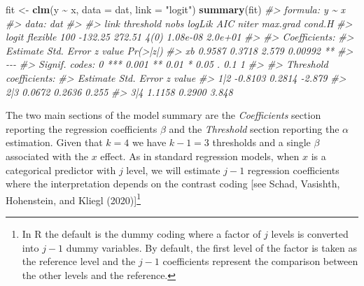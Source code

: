 \documentclass[
  man,floatsintext]{apa6}
\newenvironment{Shaded}{\begin{snugshade}}{\end{snugshade}}
\newcommand{\AttributeTok}[1]{\textcolor[rgb]{0.13,0.29,0.53}{#1}}
\newcommand{\CommentTok}[1]{\textcolor[rgb]{0.56,0.35,0.01}{\textit{#1}}}
\newcommand{\FunctionTok}[1]{\textcolor[rgb]{0.13,0.29,0.53}{\textbf{#1}}}
\newcommand{\NormalTok}[1]{#1}
\newcommand{\OtherTok}[1]{\textcolor[rgb]{0.56,0.35,0.01}{#1}}
\newcommand{\SpecialCharTok}[1]{\textcolor[rgb]{0.81,0.36,0.00}{\textbf{#1}}}
\newcommand{\StringTok}[1]{\textcolor[rgb]{0.31,0.60,0.02}{#1}}
\begin{document}
\normalsize

\scriptsize

\begin{Shaded}
\begin{Highlighting}[]
\NormalTok{fit }\OtherTok{\textless{}{-}} \FunctionTok{clm}\NormalTok{(y }\SpecialCharTok{\textasciitilde{}}\NormalTok{ x, }\AttributeTok{data =}\NormalTok{ dat, }\AttributeTok{link =} \StringTok{"logit"}\NormalTok{)}
\FunctionTok{summary}\NormalTok{(fit)}
\CommentTok{\#\textgreater{} formula: y \textasciitilde{} x}
\CommentTok{\#\textgreater{} data:    dat}
\CommentTok{\#\textgreater{} }
\CommentTok{\#\textgreater{}  link  threshold nobs logLik  AIC    niter max.grad cond.H }
\CommentTok{\#\textgreater{}  logit flexible  100  {-}132.25 272.51 4(0)  1.08e{-}08 2.0e+01}
\CommentTok{\#\textgreater{} }
\CommentTok{\#\textgreater{} Coefficients:}
\CommentTok{\#\textgreater{}    Estimate Std. Error z value Pr(\textgreater{}|z|)   }
\CommentTok{\#\textgreater{} xb   0.9587     0.3718   2.579  0.00992 **}
\CommentTok{\#\textgreater{} {-}{-}{-}}
\CommentTok{\#\textgreater{} Signif. codes:  0 \textquotesingle{}***\textquotesingle{} 0.001 \textquotesingle{}**\textquotesingle{} 0.01 \textquotesingle{}*\textquotesingle{} 0.05 \textquotesingle{}.\textquotesingle{} 0.1 \textquotesingle{} \textquotesingle{} 1}
\CommentTok{\#\textgreater{} }
\CommentTok{\#\textgreater{} Threshold coefficients:}
\CommentTok{\#\textgreater{}     Estimate Std. Error z value}
\CommentTok{\#\textgreater{} 1|2  {-}0.8103     0.2814  {-}2.879}
\CommentTok{\#\textgreater{} 2|3   0.0672     0.2636   0.255}
\CommentTok{\#\textgreater{} 3|4   1.1158     0.2900   3.848}
\end{Highlighting}
\end{Shaded}

\normalsize

The two main sections of the model summary are the \emph{Coefficients} section reporting the regression coefficients \(\beta\) and the \emph{Threshold} section reporting the \(\alpha\) estimation. Given that \(k = 4\) we have \(k - 1 = 3\) thresholds and a single \(\beta\) associated with the \(x\) effect. As in standard regression models, when \(x\) is a categorical predictor with \(j\) level, we will estimate \(j - 1\) regression coefficients where the interpretation depends on the contrast coding {[}see Schad, Vasishth, Hohenstein, and Kliegl (2020){]}\footnote{In R the default is the dummy coding where a factor of \(j\) levels is converted into \(j - 1\) dummy variables. By default, the first level of the factor is taken as the reference level and the \(j - 1\) coefficients represent the comparison between the other levels and the reference.}
\end{document}
